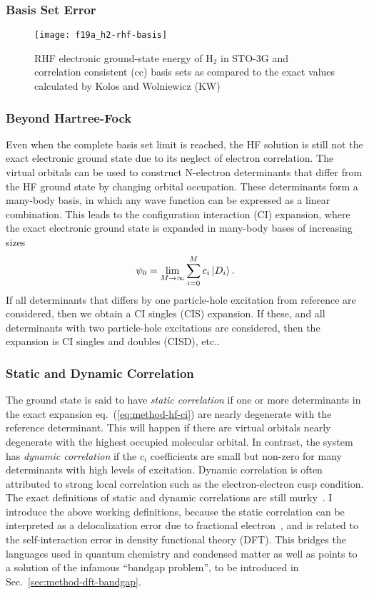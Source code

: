 \subsubsection{Basis Set Error}

\begin{figure}[h]
\centering
\texttt{[image: f19a\_h2-rhf-basis]}
\caption{RHF electronic ground-state energy of H$_2$ in STO-3G and correlation consistent (cc) basis sets as compared to the exact values calculated by Kolos and Wolniewicz (KW)~\cite{Kolos1964}}
\end{figure}

\subsubsection{Beyond Hartree-Fock}
Even when the complete basis set limit is reached, the HF solution is still not the exact electronic ground state due to its neglect of electron correlation.
The virtual orbitals can be used to construct N-electron determinants that differ from the HF ground state by changing orbital occupation.
These determinants form a many-body basis, in which any wave function can be expressed as a linear combination.
This leads to the configuration interaction (CI) expansion, where the exact electronic ground state is expanded in many-body bases of increasing sizes
\begin{align} \label{eq:method-hf-ci}
\psi_0 = \lim\limits_{M\rightarrow\infty}\sum\limits_{i=0}^{M} c_i \ket{D_i}.
\end{align}
If all determinants that differs by one particle-hole excitation from reference are considered, then we obtain a CI singles (CIS) expansion. If these, and all determinants with two particle-hole excitations are considered, then the expansion is CI singles and doubles (CISD), etc..

\subsubsection{Static and Dynamic Correlation}
The ground state is said to have \textit{static correlation} if one or more determinants in the exact expansion eq.~(\ref{eq:method-hf-ci}) are nearly degenerate with the reference determinant.
This will happen if there are virtual orbitals nearly degenerate with the highest occupied molecular orbital.
In contrast, the system has \textit{dynamic correlation} if the $c_i$ coefficients are small but non-zero for many determinants with high levels of excitation.
Dynamic correlation is often attributed to strong local correlation such as the electron-electron cusp condition.
The exact definitions of static and dynamic correlations are still murky~\cite{Benavides-Riveros2017}.
I introduce the above working definitions, because the static correlation can be interpreted as a delocalization error due to fractional electron~\cite{Cohen2008}, and is related to the self-interaction error in density functional theory (DFT).
This bridges the languages used in quantum chemistry and condensed matter as well as points to a solution of the infamous ``bandgap problem'', to be introduced in  Sec.~\ref{sec:method-dft-bandgap}.

